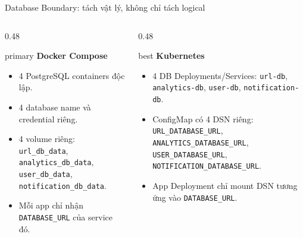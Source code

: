 \documentclass[aspectratio=169]{beamer}
\begin{document}
\begin{frame}{Database Boundary: tách vật lý, không chỉ tách logical}
    \begin{columns}[T,onlytextwidth]
        \begin{column}{0.48\textwidth}
            \begin{claimbox}{primary}
                \textbf{Docker Compose}
                \begin{itemize}\small
                    \item 4 PostgreSQL containers độc lập.
                    \item 4 database name và credential riêng.
                    \item 4 volume riêng: \texttt{url\_db\_data}, \texttt{analytics\_db\_data}, \texttt{user\_db\_data}, \texttt{notification\_db\_data}.
                    \item Mỗi app chỉ nhận \texttt{DATABASE\_URL} của service đó.
                \end{itemize}
            \end{claimbox}
        \end{column}
        \begin{column}{0.48\textwidth}
            \begin{claimbox}{best}
                \textbf{Kubernetes}
                \begin{itemize}\small
                    \item 4 DB Deployments/Services: \texttt{url-db}, \texttt{analytics-db}, \texttt{user-db}, \texttt{notification-db}.
                    \item ConfigMap có 4 DSN riêng: \texttt{URL\_DATABASE\_URL}, \texttt{ANALYTICS\_DATABASE\_URL}, \texttt{USER\_DATABASE\_URL}, \texttt{NOTIFICATION\_DATABASE\_URL}.
                    \item App Deployment chỉ mount DSN tương ứng vào \texttt{DATABASE\_URL}.
                \end{itemize}
            \end{claimbox}
        \end{column}
    \end{columns}
\end{frame}
\end{document}
